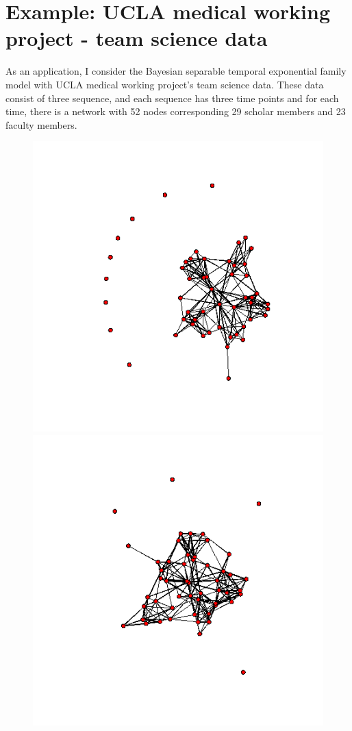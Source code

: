 \documentclass[aspectratio=169,ignorenonframetext,9pt]{beamer}
\theoremstyle{plain}
\theoremstyle{definition}
\begin{document}
\section{Example: UCLA medical working project - team science data}
As an application, I consider the Bayesian separable temporal exponential family model with UCLA medical working project's team science data.
These data consist of three sequence,
and each sequence has three time points and for each time,
there is a network with 52 nodes corresponding 29 scholar members and 23 faculty members.

\begin{figure}[h]
    \begin{center}
    \includegraphics[scale=0.23]{pictures/m1_19_nework.png}
    \includegraphics[scale=0.23]{pictures/w1_19_nework.png}

\end{center}
\end{figure}
\end{document}

